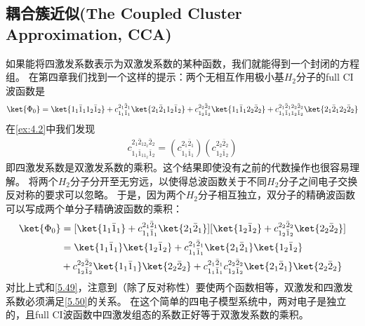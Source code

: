 \subsection{耦合簇近似(The Coupled Cluster Approximation, CCA)}
如果能将四激发系数表示为双激发系数的某种函数，我们就能得到一个封闭的方程组。
在第四章我们找到一个这样的提示：两个无相互作用极小基$H_2$分子的full CI波函数是
\begin{align}
    \label{5.49}
    \ket{\Phi_0} = \ket{1_1\bar{1}_11_2\bar{1}_2}+c_{1_1\bar{1}_1}^{2_1\bar{2}_1}\ket{2_1\bar{2}_11_2\bar{1}_2}
    +c_{1_2\bar{1}_2}^{2_2\bar{2}_2}\ket{1_1\bar{1}_12_2\bar{2}_2}+c_{1_1\bar{1}_11_2\bar{1}_2}^{2_1\bar{2}_12_2\bar{2}_2}\ket{2_1\bar{2}_12_2\bar{2}_2}
\end{align}
在\autoref{ex:4.2}中我们发现
\begin{align}
    \label{5.50}
    c_{1_1\bar{1}_11_2\bar{1}_2}^{2_1\bar{2}_12_2\bar{2}_2}=(c_{1_1\bar{1}_1}^{2_1\bar{2}_1})(c_{1_2\bar{1}_2}^{2_2\bar{2}_2})
\end{align}
即四激发系数是双激发系数的乘积。这个结果即使没有之前的代数操作也很容易理解。
将两个$H_2$分子分开至无穷远，以使得总波函数关于不同$H_2$分子之间电子交换反对称的要求可以忽略。
于是，因为两个$H_2$分子相互独立，双分子的精确波函数可以写成两个单分子精确波函数的乘积：
\begin{align}
    \ket{\Phi_0}&=[\ket{1_1\bar{1}_1}+c_{1_1\bar{1}_1}^{2_1\bar{2}_1}\ket{2_1\bar{2}_1}][\ket{1_2\bar{1}_2}+c_{1_2\bar{1}_2}^{2_2\bar{2}_2}\ket{2_2\bar{2}_2}]\notag\\
    &=\ket{1_1\bar{1}_1}\ket{1_2\bar{1}_2}+c_{1_1\bar{1}_1}^{2_1\bar{2}_1}\ket{2_1\bar{2}_1}\ket{1_2\bar{1}_2} \notag \\
    &+c_{1_2\bar{1}_2}^{2_2\bar{2}_2}\ket{1_1\bar{1}_1}\ket{2_2\bar{2}_2}+c_{1_1\bar{1}_1}^{2_1\bar{2}_1}c_{1_2\bar{1}_2}^{2_2\bar{2}_2}\ket{2_1\bar{2}_1}\ket{2_2\bar{2}_2}
\end{align}
对比上式和\autoref{5.49}，注意到（除了反对称性）要使两个函数相等，双激发和四激发系数必须满足\autoref{5.50}的关系。
在这个简单的四电子模型系统中，两对电子是独立的，且full CI波函数中四激发组态的系数正好等于双激发系数的乘积。

